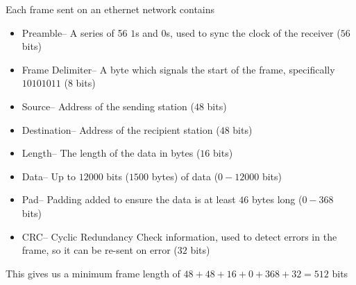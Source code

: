 Each frame sent on an ethernet network contains
\begin{itemize}
  \item Preamble-- A series of 56 $1$s and $0$s, used to sync the clock of the receiver ($56$ bits)
  \item Frame Delimiter-- A byte which signals the start of the frame, specifically $10101011$ ($8$ bits)
  \item Source-- Address of the sending station ($48$ bits)
  \item Destination-- Address of the recipient station ($48$ bits)
  \item Length-- The length of the data in bytes ($16$ bits)
  \item Data-- Up to $12000$ bits ($1500$ bytes) of data ($0 - 12000$ bits)
  \item Pad-- Padding added to ensure the data is at least $46$ bytes long ($0 - 368$ bits)
  \item CRC-- Cyclic Redundancy Check information, used to detect errors in the frame, so it can be re-sent on error
   ($32$ bits)
\end{itemize}

This gives us a minimum frame length of $48 + 48 + 16 + 0 + 368 + 32 = 512$ bits